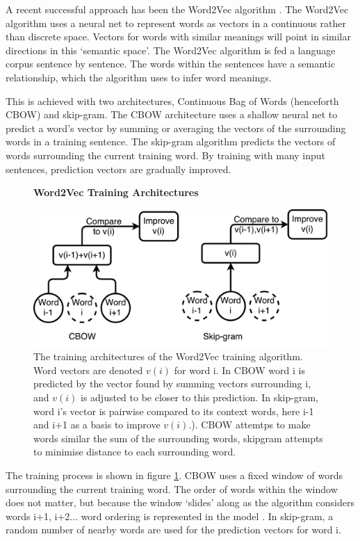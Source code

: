  A recent successful approach has been the Word2Vec algorithm \cite{word2vec1} \cite{word2vec2}. The Word2Vec algorithm uses a neural net to represent words as vectors in a continuous rather than discrete space. Vectors for words with similar meanings will point in similar directions in this `semantic space'. The Word2Vec algorithm is fed a language corpus sentence by sentence. The words within the sentences have a semantic relationship, which the algorithm uses to infer word meanings. 
 
This is achieved with two architectures, Continuous Bag of Words (henceforth CBOW) and skip-gram. The CBOW architecture uses a shallow neural net to predict a word's vector by summing or averaging the vectors of the surrounding words in a training sentence. The skip-gram algorithm predicts the vectors of words surrounding the current training word. By training with many input sentences, prediction vectors are gradually improved. 

\begin{figure}[H]
    \centering
    \textbf{Word2Vec Training Architectures}\par\medskip
    \includegraphics[width=\textwidth]{Natural_Language_Processing/cbow_v_skip.pdf}
    \caption[Word2Vec Training Architectures ]{The training architectures of the Word2Vec training algorithm. Word vectors are denoted $v(i)$ for word i. In CBOW word i is predicted by the vector found by summing vectors surrounding i, and $v(i)$ is adjusted to be closer to this prediction. In skip-gram, word i's vector is pairwise compared to its context words, here i-1 and i+1 as a basis to improve $v(i)$.). CBOW attemtps to make words similar the sum of the surrounding words, skipgram attempts to minimise distance to each surrounding word.}
     \label{fig:CBOWSKIP}
\end{figure}

The training process is shown in figure \ref{fig:CBOWSKIP}. CBOW uses a fixed window of words surrounding the current training word. The order of words within the window does not matter, but because the window `slides' along as the algorithm considers words i+1, i+2... word ordering is represented in the model . In skip-gram, a random number of nearby words are used for the prediction vectors for word i. 

